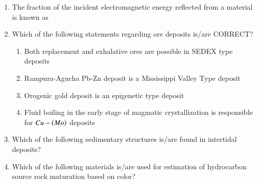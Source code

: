 \documentclass[journal,12pt,onecolumn]{IEEEtran}
\theoremstyle{remark}
\begin{document}
\begin{enumerate}
\item The fraction of the incident electromagnetic energy reflected from a material is known as
\begin{enumerate}
\end{enumerate}
\hfill{}

\item Which of the following statements regarding ore deposits is/are CORRECT?
\begin{enumerate}
    \item Both replacement and exhalative ores are possible in SEDEX type deposits
    \item Rampura-Agucha Pb-Zn deposit is a Mississippi Valley Type deposit
    \item Orogenic gold deposit is an epigenetic type deposit
    \item Fluid boiling in the early stage of magmatic crystallization is responsible for $Cu-\left(Mo\right)$ deposits
\end{enumerate}
\hfill{}

\item Which of the following sedimentary structures is/are found in intertidal deposits?
\begin{enumerate}
\end{enumerate}
\hfill{}

\item Which of the following materials is/are used for estimation of hydrocarbon source rock maturation based on color?
\begin{enumerate}
\end{enumerate}
\hfill{}


\end{enumerate}
\end{document}
